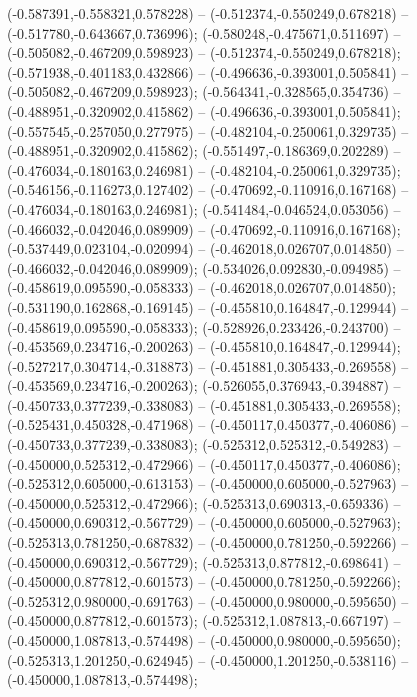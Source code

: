  (-0.587391,-0.558321,0.578228) -- (-0.512374,-0.550249,0.678218) -- (-0.517780,-0.643667,0.736996);
 (-0.580248,-0.475671,0.511697) -- (-0.505082,-0.467209,0.598923) -- (-0.512374,-0.550249,0.678218);
 (-0.571938,-0.401183,0.432866) -- (-0.496636,-0.393001,0.505841) -- (-0.505082,-0.467209,0.598923);
 (-0.564341,-0.328565,0.354736) -- (-0.488951,-0.320902,0.415862) -- (-0.496636,-0.393001,0.505841);
 (-0.557545,-0.257050,0.277975) -- (-0.482104,-0.250061,0.329735) -- (-0.488951,-0.320902,0.415862);
 (-0.551497,-0.186369,0.202289) -- (-0.476034,-0.180163,0.246981) -- (-0.482104,-0.250061,0.329735);
 (-0.546156,-0.116273,0.127402) -- (-0.470692,-0.110916,0.167168) -- (-0.476034,-0.180163,0.246981);
 (-0.541484,-0.046524,0.053056) -- (-0.466032,-0.042046,0.089909) -- (-0.470692,-0.110916,0.167168);
 (-0.537449,0.023104,-0.020994) -- (-0.462018,0.026707,0.014850) -- (-0.466032,-0.042046,0.089909);
 (-0.534026,0.092830,-0.094985) -- (-0.458619,0.095590,-0.058333) -- (-0.462018,0.026707,0.014850);
 (-0.531190,0.162868,-0.169145) -- (-0.455810,0.164847,-0.129944) -- (-0.458619,0.095590,-0.058333);
 (-0.528926,0.233426,-0.243700) -- (-0.453569,0.234716,-0.200263) -- (-0.455810,0.164847,-0.129944);
 (-0.527217,0.304714,-0.318873) -- (-0.451881,0.305433,-0.269558) -- (-0.453569,0.234716,-0.200263);
 (-0.526055,0.376943,-0.394887) -- (-0.450733,0.377239,-0.338083) -- (-0.451881,0.305433,-0.269558);
 (-0.525431,0.450328,-0.471968) -- (-0.450117,0.450377,-0.406086) -- (-0.450733,0.377239,-0.338083);
 (-0.525312,0.525312,-0.549283) -- (-0.450000,0.525312,-0.472966) -- (-0.450117,0.450377,-0.406086);
 (-0.525312,0.605000,-0.613153) -- (-0.450000,0.605000,-0.527963) -- (-0.450000,0.525312,-0.472966);
 (-0.525313,0.690313,-0.659336) -- (-0.450000,0.690312,-0.567729) -- (-0.450000,0.605000,-0.527963);
 (-0.525313,0.781250,-0.687832) -- (-0.450000,0.781250,-0.592266) -- (-0.450000,0.690312,-0.567729);
 (-0.525313,0.877812,-0.698641) -- (-0.450000,0.877812,-0.601573) -- (-0.450000,0.781250,-0.592266);
 (-0.525312,0.980000,-0.691763) -- (-0.450000,0.980000,-0.595650) -- (-0.450000,0.877812,-0.601573);
 (-0.525312,1.087813,-0.667197) -- (-0.450000,1.087813,-0.574498) -- (-0.450000,0.980000,-0.595650);
 (-0.525313,1.201250,-0.624945) -- (-0.450000,1.201250,-0.538116) -- (-0.450000,1.087813,-0.574498);
